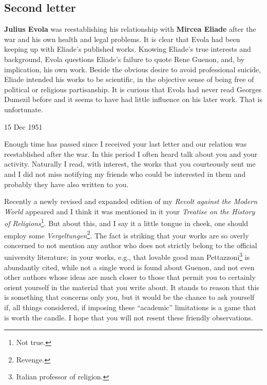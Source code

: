 \subsection{Second letter}

\begin{quotex}
\textbf{Julius Evola} was reestablishing his relationship with \textbf{Mircea Eliade} after the war and his own health and legal problems. It is clear that Evola had been keeping up with Eliade's published works. Knowing Eliade's true interests and background, Evola questions Eliade's failure to quote Rene Guenon, and, by implication, his own work. Beside the obvious desire to avoid professional suicide, Eliade intended his works to be scientific, in the objective sense of being free of political or religious partisanship. It is curious that Evola had never read Georges Dumezil before and it seems to have had little influence on his later work. That is unfortunate.
\end{quotex}


15 Dec 1951

Enough time has passed since I received your last letter and our relation was reestablished after the war. In this period I often heard talk about you and your activity. Naturally I read, with interest, the works that you courteously sent me and I did not miss notifying my friends who could be interested in them and probably they have also written to you.

Recently a newly revised and expanded edition of my \emph{Revolt against the Modern World} appeared and I think it was mentioned in it your \emph{Treatise on the History of Religions}\footnote{Not true.}. But about this, and I say it a little tongue in cheek, one should employ some \emph{Vergeltungen}\footnote{Revenge.}. The fact is striking that your works are so overly concerned to not mention any author who does not strictly belong to the official university literature; in your works, e.g., that lovable good man Pettazzoni\footnote{Italian professor of religion.} is abundantly cited, while not a single word is found about Guenon, and not even other authors whose ideas are much closer to those that permit you to certainly orient yourself in the material that you write about. It stands to reason that this is something that concerns only you, but it would be the chance to ask yourself if, all things considered, if imposing these ``academic'' limitations is a game that is worth the candle. I hope that you will not resent these friendly observations.

